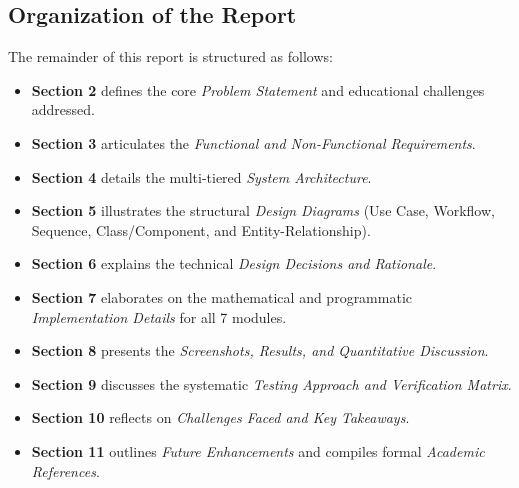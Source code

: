 \subsection{Organization of the Report}
The remainder of this report is structured as follows:
\begin{itemize}
    \item \textbf{Section 2} defines the core \textit{Problem Statement} and educational challenges addressed.
    \item \textbf{Section 3} articulates the \textit{Functional and Non-Functional Requirements}.
    \item \textbf{Section 4} details the multi-tiered \textit{System Architecture}.
    \item \textbf{Section 5} illustrates the structural \textit{Design Diagrams} (Use Case, Workflow, Sequence, Class/Component, and Entity-Relationship).
    \item \textbf{Section 6} explains the technical \textit{Design Decisions and Rationale}.
    \item \textbf{Section 7} elaborates on the mathematical and programmatic \textit{Implementation Details} for all 7 modules.
    \item \textbf{Section 8} presents the \textit{Screenshots, Results, and Quantitative Discussion}.
    \item \textbf{Section 9} discusses the systematic \textit{Testing Approach and Verification Matrix}.
    \item \textbf{Section 10} reflects on \textit{Challenges Faced and Key Takeaways}.
    \item \textbf{Section 11} outlines \textit{Future Enhancements} and compiles formal \textit{Academic References}.
\end{itemize}
